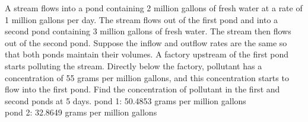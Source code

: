 {
A stream flows into a pond containing 2 million gallons of fresh water at a rate of 1 million gallons per day.  The stream flows out of the first pond and into a second pond containing 3 million gallons of fresh water.  The stream then flows out of the second pond.  Suppose the inflow and outflow rates are the same so that both ponds maintain their volumes.  A factory upstream of the first pond starts polluting the stream.  Directly below the factory, pollutant has a concentration of 55 grams per million gallons, and this concentration starts to flow into the first pond.  Find the concentration of pollutant in the first and second ponds at 5 days.
}
{
pond 1: 50.4853 grams per million gallons\\
pond 2: 32.8649 grams per million gallons
}
